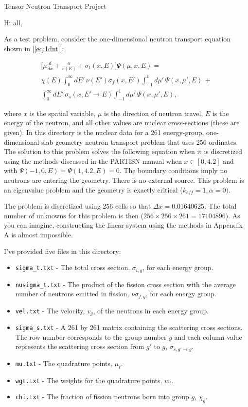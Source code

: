 \documentclass[fontsize=12pt, paper=a4]{scrlttr2}
\begin{document}
\begin{letter}{Tensor Neutron Transport Project}

\opening{}  %
Hi all,

As a test problem, consider the one-dimensional neutron transport equation shown in [\ref{eq:1dnt}]:

\begin{multline}
\bigg [ \mu \frac{d}{dx} + \frac{\alpha}{v(E)} + \sigma_{t}(x,E) \bigg ] \Psi(\mu,x,E) = \\\chi(E) \int_{0}^{\infty} dE' \, \nu(E') \sigma_{f}(x,E') \int_{-1}^{1} d\mu' \, \Psi(x,\mu',E) \,+ \\\int_{0}^{\infty} dE' \, \sigma_{s}(x, E' \rightarrow E) \int_{-1}^{1} d\mu' \, \Psi(x,\mu',E),
\label{eq:1dnt}
\end{multline}

where $x$ is the spatial variable, $\mu$ is the direction of neutron travel, $E$ is the energy of the neutron, and all other values are nuclear cross-sections (these are given). In this directory is the nuclear data for a 261 energy-group, one-dimensional slab geometry neutron transport problem that uses 256 ordinates. The solution to this problem solves the following equation when it is discretized using the methods discussed in the PARTISN manual when $x \in [0, 4.2]$ and with $\Psi(-1,0,E) = \Psi(1,4.2,E) = 0$. The boundary conditions imply no neutrons are entering the geometry. There is no external source. This problem is an eigenvalue problem and the geometry is exactly critical ($k_{eff} = 1, \alpha = 0)$.

The problem is discretized using 256 cells so that $\Delta x = 0.01640625$. The total number of unknowns for this problem is then ($256 \times 256 \times 261 = 17104896$). As you can imagine, constructing the linear system using the methods in Appendix A is almost impossible.

I've provided five files in this directory:

\begin{itemize}
	\item {\tt{sigma\_t.txt}} - The total cross section, $\sigma_{t,g}$, for each energy group.
	\item {\tt{nusigma\_t.txt}} - The product of the fission cross section with the average number of neutrons emitted in fission, $\nu\sigma_{f,g}$, for each energy group.
	\item {\tt{vel.txt}} - The velocity, $v_{g}$, of the neutrons in each energy group.
	\item {\tt{sigma\_s.txt}} - A 261 by 261 matrix containing the scattering cross sections. The row number corresponds to the group number $g$ and each column value represents the scattering cross section from $g'$ to $g$, $\sigma_{s,g'\rightarrow g}$.
	\item {\tt{mu.txt}} - The quadrature points, $\mu_{\ell}$.
	\item {\tt{wgt.txt}} - The weights for the quadrature points, $w_{\ell}$.
	\item {\tt{chi.txt}} - The fraction of fission neutrons born into group $g$, $\chi_{g}$.
\end{itemize}


\end{letter}
\end{document}
